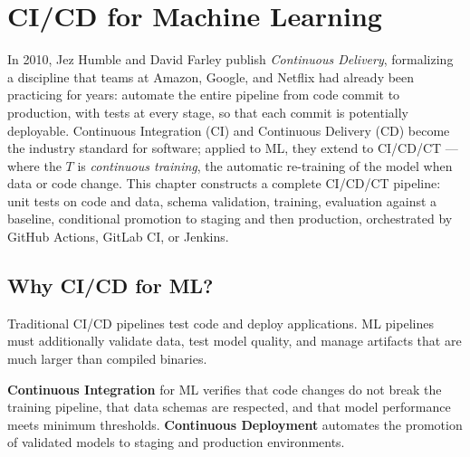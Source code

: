 \chapter{CI/CD for Machine Learning}
\label{ch:cicd}

In 2010, Jez Humble and David Farley publish \emph{Continuous Delivery}, formalizing a discipline that teams at Amazon, Google, and Netflix had already been practicing for years: automate the entire pipeline from code commit to production, with tests at every stage, so that each commit is potentially deployable. Continuous Integration (CI) and Continuous Delivery (CD) become the industry standard for software; applied to ML, they extend to CI/CD/CT --- where the $T$ is \emph{continuous training}, the automatic re-training of the model when data or code change. This chapter constructs a complete CI/CD/CT pipeline: unit tests on code and data, schema validation, training, evaluation against a baseline, conditional promotion to staging and then production, orchestrated by GitHub Actions, GitLab CI, or Jenkins.

\section{Why CI/CD for ML?}
\label{sec:why-cicd}

Traditional CI/CD pipelines test code and deploy applications.
ML pipelines must additionally validate data, test model quality, and
manage artifacts that are much larger than compiled binaries.

\begin{definition}[CI/CD for ML]
\textbf{Continuous Integration} for ML
verifies that code changes do not break the training pipeline, that
data schemas are respected, and that model performance meets minimum
thresholds. \textbf{Continuous Deployment}
automates the promotion of validated models to staging and production
environments.
\end{definition}

